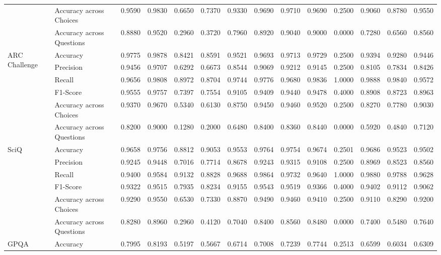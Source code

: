 \begin{table}[htbp]
{\begin{tabular}{llcccccccccccc}
 & Accuracy across Choices & 0.9590 & 0.9830 & 0.6650 & 0.7370 & 0.9330 & 0.9690 & 0.9710 & 0.9690 & 0.2500 & 0.9060 & 0.8780 & 0.9550 \\
 & Accuracy across Questions & 0.8880 & 0.9520 & 0.2960 & 0.3720 & 0.7960 & 0.8920 & 0.9040 & 0.9000 & 0.0000 & 0.7280 & 0.6560 & 0.8560 \\
\hline
\multirow{6}{*}{ARC Challenge} & Accuracy & 0.9775 & 0.9878 & 0.8421 & 0.8591 & 0.9521 & 0.9693 & 0.9713 & 0.9729 & 0.2500 & 0.9394 & 0.9280 & 0.9446 \\
 & Precision & 0.9456 & 0.9707 & 0.6292 & 0.6673 & 0.8544 & 0.9069 & 0.9212 & 0.9145 & 0.2500 & 0.8105 & 0.7834 & 0.8426 \\
 & Recall & 0.9656 & 0.9808 & 0.8972 & 0.8704 & 0.9744 & 0.9776 & 0.9680 & 0.9836 & 1.0000 & 0.9888 & 0.9840 & 0.9572 \\
 & F1-Score & 0.9555 & 0.9757 & 0.7397 & 0.7554 & 0.9105 & 0.9409 & 0.9440 & 0.9478 & 0.4000 & 0.8908 & 0.8723 & 0.8963 \\
 & Accuracy across Choices & 0.9370 & 0.9670 & 0.5340 & 0.6130 & 0.8750 & 0.9450 & 0.9460 & 0.9520 & 0.2500 & 0.8270 & 0.7780 & 0.9030 \\
 & Accuracy across Questions & 0.8200 & 0.9000 & 0.1280 & 0.2000 & 0.6480 & 0.8400 & 0.8360 & 0.8440 & 0.0000 & 0.5920 & 0.4840 & 0.7120 \\
\hline
\multirow{6}{*}{SciQ} & Accuracy & 0.9658 & 0.9756 & 0.8812 & 0.9053 & 0.9553 & 0.9764 & 0.9754 & 0.9674 & 0.2501 & 0.9686 & 0.9523 & 0.9502 \\
 & Precision & 0.9245 & 0.9448 & 0.7016 & 0.7714 & 0.8678 & 0.9243 & 0.9315 & 0.9108 & 0.2500 & 0.8969 & 0.8523 & 0.8560 \\
 & Recall & 0.9400 & 0.9584 & 0.9132 & 0.8828 & 0.9688 & 0.9864 & 0.9732 & 0.9640 & 1.0000 & 0.9880 & 0.9788 & 0.9628 \\
 & F1-Score & 0.9322 & 0.9515 & 0.7935 & 0.8234 & 0.9155 & 0.9543 & 0.9519 & 0.9366 & 0.4000 & 0.9402 & 0.9112 & 0.9062 \\
 & Accuracy across Choices & 0.9290 & 0.9550 & 0.6530 & 0.7330 & 0.8870 & 0.9490 & 0.9460 & 0.9410 & 0.2500 & 0.9110 & 0.8290 & 0.9200 \\
 & Accuracy across Questions & 0.8280 & 0.8960 & 0.2960 & 0.4120 & 0.7040 & 0.8400 & 0.8560 & 0.8480 & 0.0000 & 0.7400 & 0.5480 & 0.7640 \\
\hline
\multirow{6}{*}{GPQA} & Accuracy & 0.7995 & 0.8193 & 0.5197 & 0.5667 & 0.6714 & 0.7008 & 0.7239 & 0.7744 & 0.2513 & 0.6599 & 0.6034 & 0.6309 \\

\end{tabular}}
\end{table}
